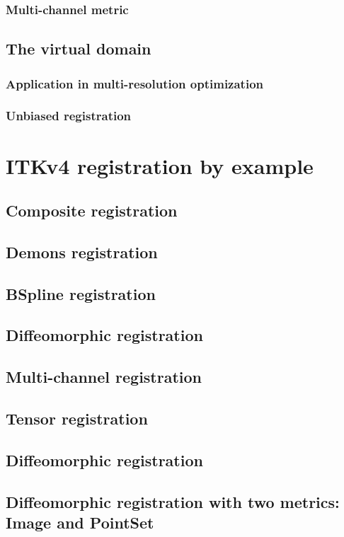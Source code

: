 \documentclass{llncs}
\begin{document}
\subsubsection{Multi-channel metric}

\subsection{The virtual domain}
\subsubsection{Application in multi-resolution optimization}
\subsubsection{Unbiased registration}

\section{ITKv4 registration by example}

\subsection{Composite registration}
\subsection{Demons registration}
\subsection{BSpline registration}
\subsection{Diffeomorphic registration}
\subsection{Multi-channel registration}
\subsection{Tensor registration}
\subsection{Diffeomorphic registration}
\subsection{Diffeomorphic registration with two metrics: Image and
  PointSet}
\end{document}
